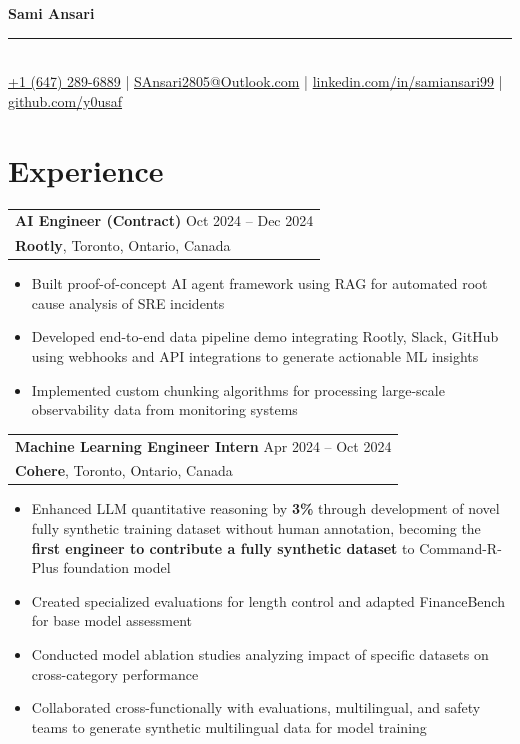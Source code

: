\documentclass[letterpaper,10pt]{article}
\makeatletter
\newenvironment{resumeitemize}{
  \begin{itemize}[leftmargin=0.5in, itemsep=-1pt, topsep=1pt, labelsep=0.035in]
}{
  \end{itemize}
}
\newcommand{\experience}[4]{
  \begin{tabular}[t]{@{}p{6.5in}@{}}
    {\large\bfseries #1} \hfill {\small #2} \\
    {\bfseries #3}, #4
  \end{tabular}
}
\newcommand{\sectionspace}{\vspace{2pt}}
\makeatother
\begin{document}
\begin{center}
{\LARGE\bfseries Sami Ansari} \\
\vspace{1pt}
{\rule{0.3\textwidth}{0.5pt}} \\
\vspace{2pt}
\small \href{tel:+16472896889}{+1 (647) 289-6889} \enspace | \enspace \href{mailto:SAnsari2805@Outlook.com}{SAnsari2805@Outlook.com} \enspace | \enspace \href{https://linkedin.com/in/samiansari99/}{linkedin.com/in/samiansari99} \enspace | \enspace \href{https://github.com/y0usaf}{github.com/y0usaf}
\end{center}
\vspace{-6pt}

\section{Experience}

\hspace{0.15in} \experience{AI Engineer (Contract)}{Oct 2024 -- Dec 2024}{Rootly}{Toronto, Ontario, Canada}
\begin{resumeitemize}
\item Built proof-of-concept AI agent framework using RAG for automated root cause analysis of SRE incidents
\item Developed end-to-end data pipeline demo integrating Rootly, Slack, GitHub using webhooks and API integrations to generate actionable ML insights
\item Implemented custom chunking algorithms for processing large-scale observability data from monitoring systems
\end{resumeitemize}
\sectionspace

\hspace{0.15in} \experience{Machine Learning Engineer Intern}{Apr 2024 -- Oct 2024}{Cohere}{Toronto, Ontario, Canada}
\begin{resumeitemize}
\item Enhanced LLM quantitative reasoning by \textbf{3\%} through development of novel fully synthetic training dataset without human annotation, becoming the \textbf{first engineer to contribute a fully synthetic dataset} to Command-R-Plus foundation model
\item Created specialized evaluations for length control and adapted FinanceBench for base model assessment
\item Conducted model ablation studies analyzing impact of specific datasets on cross-category performance
\item Collaborated cross-functionally with evaluations, multilingual, and safety teams to generate synthetic multilingual data for model training
\end{resumeitemize}
\sectionspace
\end{document}
